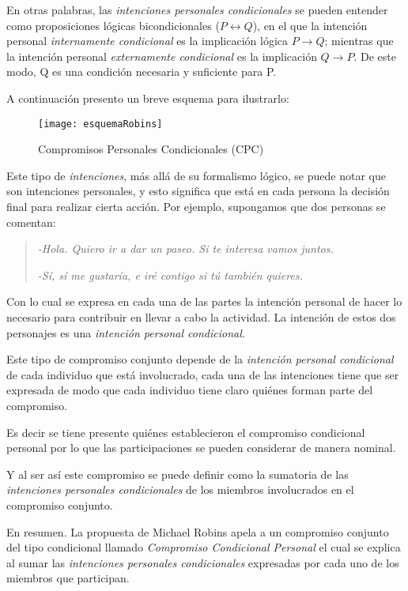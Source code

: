 \documentclass[oneside]{book}
\begin{document}
En otras palabras, las \textit{intenciones personales condicionales} se pueden entender como proposiciones lógicas bicondicionales ($P \leftrightarrow Q$), en el que la intención personal \textit{internamente condicional} es la implicación lógica  $P \rightarrow Q$; mientras que la intención personal \textit{externamente condicional} es la implicación $Q \rightarrow P$. De este modo, Q es una condición necesaria y suficiente para P.

A continuación presento un breve esquema para ilustrarlo:

\begin{figure}[h]
	\centering
	\texttt{[image: esquemaRobins]}
	\caption{Compromisos Personales Condicionales (CPC)}

\end{figure}
Este tipo de \textit{intenciones}, más allá de su formalismo lógico, se puede notar que son intenciones personales, y esto significa que está en cada persona la decisión final para realizar cierta acción. Por ejemplo, supongamos que dos personas se comentan: 
\begin{quote}

	\textit{-Hola. Quiero ir a dar un paseo. Si te interesa vamos juntos.}

	\textit{-Sí, sí me gustaría, e iré contigo si tú también quieres.}
\end{quote}

Con lo cual se expresa en cada una de las partes la intención personal de hacer lo necesario para contribuir en llevar a cabo la actividad. La intención de estos dos personajes es una \textit{intención personal condicional.}

Este tipo de compromiso conjunto depende de la \textit{intención personal condicional} de cada individuo que está involucrado, cada una de las intenciones tiene que ser expresada de modo que cada individuo tiene claro quiénes forman parte del compromiso.

Es decir se tiene presente quiénes establecieron el compromiso condicional personal por lo que las participaciones se pueden considerar de manera nominal.

Y al ser así este compromiso se puede definir como la sumatoria de las \textit{intenciones personales condicionales} de los miembros involucrados en el compromiso conjunto.

En resumen. La propuesta de Michael Robins apela a un compromiso conjunto del tipo condicional llamado \textit{Compromiso Condicional Personal} el cual se explica al sumar las \textit{intenciones personales condicionales} expresadas por cada uno de los miembros que participan.
\end{document}

